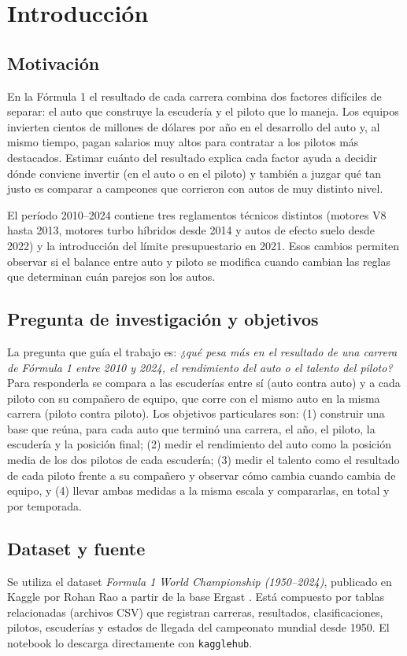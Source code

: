 \documentclass[11pt,a4paper]{article}
\begin{document}
\section{Introducción}

\subsection{Motivación}
En la Fórmula 1 el resultado de cada carrera combina dos factores difíciles
de separar: el auto que construye la escudería y el piloto que lo maneja. Los
equipos invierten cientos de millones de dólares por año en el desarrollo del
auto y, al mismo tiempo, pagan salarios muy altos para contratar a los pilotos
más destacados. Estimar cuánto del resultado explica cada factor ayuda a
decidir dónde conviene invertir (en el auto o en el piloto) y también a juzgar
qué tan justo es comparar a campeones que corrieron con autos de muy distinto
nivel.

El período 2010--2024 contiene tres reglamentos técnicos distintos (motores
V8 hasta 2013, motores turbo híbridos desde 2014 y autos de efecto suelo desde
2022) y la introducción del límite presupuestario en 2021. Esos cambios
permiten observar si el balance entre auto y piloto se modifica cuando cambian
las reglas que determinan cuán parejos son los autos.

\subsection{Pregunta de investigación y objetivos}
La pregunta que guía el trabajo es: \emph{¿qué pesa más en el resultado de una
carrera de Fórmula 1 entre 2010 y 2024, el rendimiento del auto o el talento
del piloto?} Para responderla se compara a las escuderías entre sí (auto
contra auto) y a cada piloto con su compañero de equipo, que corre con el
mismo auto en la misma carrera (piloto contra piloto). Los objetivos
particulares son: (1) construir una base que reúna, para cada auto que terminó
una carrera, el año, el piloto, la escudería y la posición final; (2) medir el
rendimiento del auto como la posición media de los dos pilotos de cada
escudería; (3) medir el talento como el resultado de cada piloto frente a su
compañero y observar cómo cambia cuando cambia de equipo, y (4) llevar ambas
medidas a la misma escala y compararlas, en total y por temporada.

\subsection{Dataset y fuente}
Se utiliza el dataset \emph{Formula 1 World Championship (1950--2024)},
publicado en Kaggle por Rohan Rao a partir de la base Ergast
\cite{kaggle}. Está compuesto por tablas relacionadas (archivos CSV) que
registran carreras, resultados, clasificaciones, pilotos, escuderías y
estados de llegada del campeonato mundial desde 1950. El notebook lo descarga
directamente con \texttt{kagglehub}.
\end{document}
